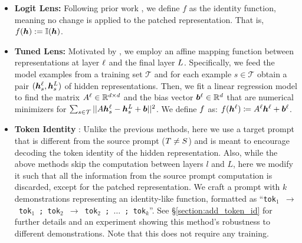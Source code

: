 \documentclass{article}
\theoremstyle{plain}
\theoremstyle{definition}
\theoremstyle{remark}
\begin{document}
\begin{itemize}[itemsep=1pt, topsep=0pt,leftmargin=*]
    \item \textbf{Logit Lens:} Following prior work \citep{logitlens, geva-etal-2022-lm}, we define $f$ as the identity function, meaning no change is applied to the patched representation. That is, $f({\bm{h}}) := \mathbb{I}({\bm{h}})$.

    \item \textbf{Tuned Lens:} Motivated by \citet{belrose2023eliciting,din2023jump}, we employ an affine mapping function between representations at layer $\ell$ and the final layer $L$.
    Specifically, we feed the model examples from a training set $\mathcal{T}$ and for each example $s\in\mathcal{T}$ obtain a pair  $({\bm{h}}_{s}^\ell, {\bm{h}}_{s}^L)$ of hidden representations. Then, we fit a linear regression model to find the matrix $A^{\ell} \in \mathbb{R}^{d \times d}$ and the bias vector ${\bm{b}}^{\ell}\in \mathbb{R}^{d}$ that are numerical minimizers for $\sum_{s \in \mathcal{T}} || A {\bm{h}}_{s}^\ell - {\bm{h}}_{s}^{L} + {\bm{b}} ||^2$.
    We define $f$ as:
        $f({\bm{h}}^\ell) \coloneqq A^{\ell} {\bm{h}}^\ell + {\bm{b}}^{\ell}$.
    
    \item \textbf{Token Identity} \methodName{}: Unlike the previous methods, here we use a target prompt that is different from the source prompt ($T \neq S$) and is meant to encourage decoding the token identity of the hidden representation. Also, while the above methods skip the computation between layers $l$ and $L$, here we modify it such that all the information from the source prompt computation is discarded,
 except for the patched representation.
    We craft a prompt with $k$ demonstrations representing an identity-like function, formatted as ``\texttt{tok$_1$\,$\rightarrow$\,tok$_1$\,;\,tok$_2$\,$\rightarrow$\,tok$_2$\,;\,$\ldots$\,;\,tok$_k$}''. See \S\ref{section:add_token_id} for further details and an experiment showing this method's robustness to different demonstrations.
    Note that this \methodName{} does not require any training.
\end{itemize}
\end{document}
